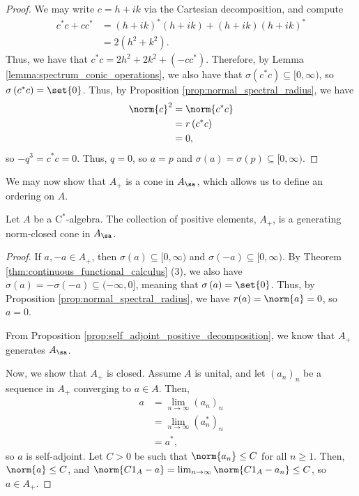 \begin{proof}
  We may write $c = h + ik$ via the Cartesian decomposition, and compute
  \begin{align*}
    c^{\ast}c + cc^{\ast} &= \left( h + ik \right)^{\ast}\left( h + ik \right) + \left( h + ik \right)\left( h + ik \right)^{\ast}\\
                          &= 2\left( h^2 + k^2 \right).
  \end{align*}
  Thus, we have that $c^{\ast}c = 2h^2 + 2k^2 + \left( -cc^{\ast} \right)$. Therefore, by Lemma \ref{lemma:spectrum_conic_operations}, we also have that $\sigma\left( c^{\ast}c \right)\subseteq [0,\infty)$, so $\sigma\left( c^{\ast}c \right) = \set{0}$. Thus, by Proposition \ref{prop:normal_spectral_radius}, we have
  \begin{align*}
    \norm{c}^2 &= \norm{c^{\ast}c}\\
               &= r\left( c^{\ast}c \right)\\
               &= 0,
  \end{align*}
  so $-q^3 = c^{\ast}c = 0$. Thus, $q = 0$, so $a = p$ and $\sigma\left( a \right) = \sigma\left( p \right)\subseteq [0,\infty)$.
\end{proof}
We may now show that $A_{+}$ is a cone in $A_{\sa}$, which allows us to define an ordering on $A$.
\begin{corollary}
  Let $A$ be a $\mathrm{C}^{\ast}$-algebra. The collection of positive elements, $A_{+}$, is a generating norm-closed cone in $A_{\sa}$.
\end{corollary}
\begin{proof}
  If $a,-a\in A_{+}$, then $\sigma\left( a \right)\subseteq [0,\infty)$ and $\sigma\left( -a \right) \subseteq [0,\infty)$. By Theorem \ref{thm:continuous_functional_calculus} (3), we also have $\sigma\left( a \right) = -\sigma\left( -a \right)\subseteq (-\infty,0]$, meaning that $\sigma\left( a \right) = \set{0}$. Thus, by Proposition \ref{prop:normal_spectral_radius}, we have $r(a) = \norm{a} = 0$, so $a = 0$.\newline

  From Proposition \ref{prop:self_adjoint_positive_decomposition}, we know that $A_{+}$ generates $A_{\sa}$.\newline

  Now, we show that $A_{+}$ is closed. Assume $A$ is unital, and let $\left( a_n \right)_n$ be a sequence in $A_{+}$ converging to $a\in A$. Then,
  \begin{align*}
    a &= \lim_{n\rightarrow\infty}\left( a_n \right)_n\\
      &= \lim_{n\rightarrow\infty}\left( a_n^{\ast} \right)_n\\
      &= a^{\ast},
  \end{align*}
  so $a$ is self-adjoint. Let $C > 0$ be such that $\norm{a_n}\leq C$ for all $n\geq 1$. Then, $\norm{a}\leq C$, and $\norm{C1_A - a} = \lim_{n\rightarrow\infty}\norm{C1_A - a_n}\leq C$, so $a\in A_{+}$.
\end{proof}
